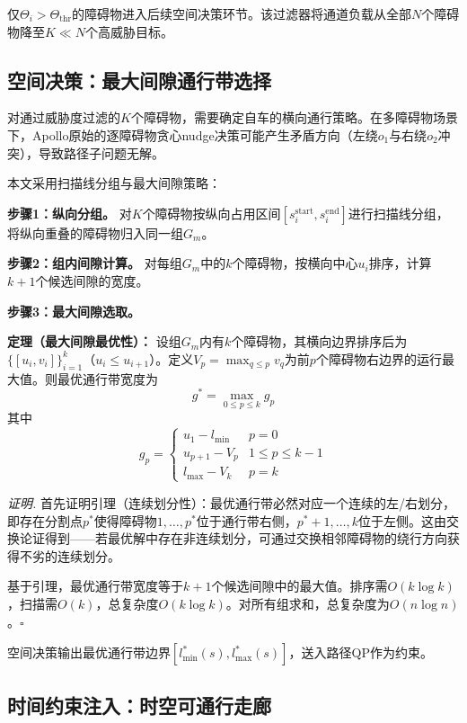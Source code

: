 \documentclass[a4paper,11pt]{article}
\begin{document}
仅$\Theta_i > \Theta_{\text{thr}}$的障碍物进入后续空间决策环节。该过滤器将通道负载从全部$N$个障碍物降至$K \ll N$个高威胁目标。

\subsection{空间决策：最大间隙通行带选择}

对通过威胁度过滤的$K$个障碍物，需要确定自车的横向通行策略。在多障碍物场景下，Apollo原始的逐障碍物贪心nudge决策可能产生矛盾方向（左绕$o_1$与右绕$o_2$冲突），导致路径子问题无解。

本文采用扫描线分组与最大间隙策略：

\textbf{步骤1：纵向分组。} 对$K$个障碍物按纵向占用区间$[s_i^{\text{start}}, s_i^{\text{end}}]$进行扫描线分组，将纵向重叠的障碍物归入同一组$G_m$。

\textbf{步骤2：组内间隙计算。} 对每组$G_m$中的$k$个障碍物，按横向中心$u_i$排序，计算$k+1$个候选间隙的宽度。

\textbf{步骤3：最大间隙选取。}

\textbf{定理（最大间隙最优性）：} 设组$G_m$内有$k$个障碍物，其横向边界排序后为$\{[u_i, v_i]\}_{i=1}^{k}$（$u_i \leq u_{i+1}$）。定义$V_p = \max_{q \leq p} v_q$为前$p$个障碍物右边界的运行最大值。则最优通行带宽度为
\begin{equation}
  g^* = \max_{0 \leq p \leq k} g_p
\end{equation}
其中
\begin{equation}
  g_p = \begin{cases}
    u_1 - l_{\min} & p = 0 \\
    u_{p+1} - V_p & 1 \leq p \leq k-1 \\
    l_{\max} - V_k & p = k
  \end{cases}
\end{equation}

\textit{证明.} 首先证明引理（连续划分性）：最优通行带必然对应一个连续的左/右划分，即存在分割点$p^*$使得障碍物$1, \ldots, p^*$位于通行带右侧，$p^*+1, \ldots, k$位于左侧。这由交换论证得到——若最优解中存在非连续划分，可通过交换相邻障碍物的绕行方向获得不劣的连续划分。

基于引理，最优通行带宽度等于$k+1$个候选间隙中的最大值。排序需$O(k \log k)$，扫描需$O(k)$，总复杂度$O(k \log k)$。对所有组求和，总复杂度为$O(n \log n)$。\hfill$\square$

空间决策输出最优通行带边界$[l_{\min}^*(s), l_{\max}^*(s)]$，送入路径QP作为约束。

\subsection{时间约束注入：时空可通行走廊}
\end{document}
